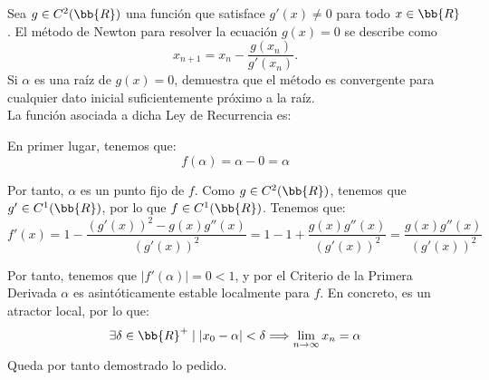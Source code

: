 \begin{ejercicio}
    Sea $g\in C^2(\bb{R})$ una función que satisface $g'(x)\neq 0$ para todo $x \in \bb{R}$. El método de Newton para resolver la ecuación $g(x) = 0$ se describe como
    \begin{equation*}
        x_{n+1} = x_n - \frac{g(x_n)}{g'(x_n)}.
    \end{equation*}
    Si $\alpha$ es una raíz de $g(x) = 0$, demuestra que el método es convergente para cualquier dato inicial suficientemente próximo a la raíz.\\

    La función asociada a dicha Ley de Recurrencia es:

    En primer lugar, tenemos que:
    \begin{equation*}
        f(\alpha)=\alpha-0 = \alpha
    \end{equation*}

    Por tanto, $\alpha$ es un punto fijo de $f$. Como $g\in C^2(\bb{R})$, tenemos que $g'\in C^1(\bb{R})$, por lo que $f\in C^1(\bb{R})$. Tenemos que:
    \begin{equation*}
        f'(x) = 1 - \frac{(g'(x))^2-g(x)g''(x)}{(g'(x))^2}
        = 1 -1 + \frac{g(x)g''(x)}{(g'(x))^2}
        = \frac{g(x)g''(x)}{(g'(x))^2}
    \end{equation*}

    Por tanto, tenemos que $|f'(\alpha)|=0<1$, y por el Criterio de la Primera Derivada $\alpha$ es asintóticamente estable localmente para $f$. En concreto, es un atractor local, por lo que:
    \begin{equation*}
        \exists \delta\in \bb{R}^+\mid |x_0-\alpha|<\delta\Longrightarrow
        \lim_{n\to \infty} x_n = \alpha
    \end{equation*}
    Queda por tanto demostrado lo pedido.
\end{ejercicio}



